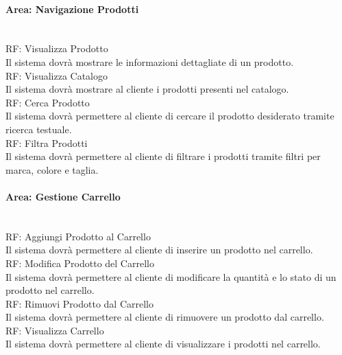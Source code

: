 \paragraph{Area: Navigazione Prodotti}\mbox{}\\
RF\thecontrequisiti: Visualizza Prodotto\\
Il sistema dovrà mostrare le informazioni dettagliate di un prodotto.\vspace{10px} \\ 
RF\thecontrequisiti: Visualizza Catalogo\\
Il sistema dovrà mostrare al cliente i prodotti presenti nel catalogo.\vspace{10px} \\ 
RF\thecontrequisiti: Cerca Prodotto\\
Il sistema dovrà permettere al cliente di cercare il prodotto desiderato tramite ricerca testuale.\vspace{10px} \\ 
RF\thecontrequisiti: Filtra Prodotti\\
Il sistema dovrà permettere al cliente di filtrare i prodotti tramite filtri per marca, colore e taglia.\vspace{10px} \\ 


\paragraph{Area: Gestione Carrello}\mbox{}\\
RF\thecontrequisiti: Aggiungi Prodotto al Carrello\\
Il sistema dovrà permettere al cliente di inserire un prodotto nel carrello.\vspace{10px} \\ 
RF\thecontrequisiti: Modifica Prodotto del Carrello\\
Il sistema dovrà permettere al cliente di modificare la quantità e lo stato di un prodotto nel carrello.\vspace{10px} \\ 
RF\thecontrequisiti: Rimuovi Prodotto dal Carrello\\
Il sistema dovrà permettere al cliente di rimuovere un prodotto dal carrello.\vspace{10px} \\ 
RF\thecontrequisiti: Visualizza Carrello\\
Il sistema dovrà permettere al cliente di visualizzare i prodotti nel carrello.\vspace{10px} \\ 

